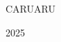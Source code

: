 \begin{center}
    \vspace{2cm}
    
    
    
    \newcommand{\cidade}{CARUARU}
    \newcommand{\ano}{2025}
    
    \vfill
    \cidade
    
    \ano
    
\end{center}
